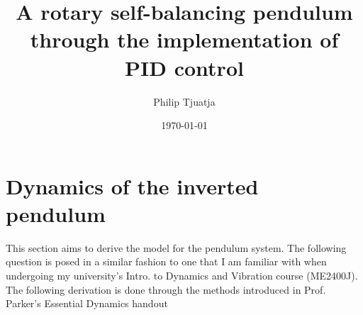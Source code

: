 \documentclass[12pt]{article}
\title{A rotary self-balancing pendulum through the implementation of PID control}
\author{Philip Tjuatja}
\date{\today}
\begin{document}
\maketitle

\tableofcontents

\section{Dynamics of the inverted pendulum}

This section aims to derive the model for the pendulum system. The following question is posed in a similar fashion to one that I am familiar with when undergoing my university's Intro. to Dynamics and Vibration course (ME2400J). The following derivation is done through the methods introduced in Prof. Parker's Essential Dynamics handout \cite{Parker2026Essential} 
\end{document}
